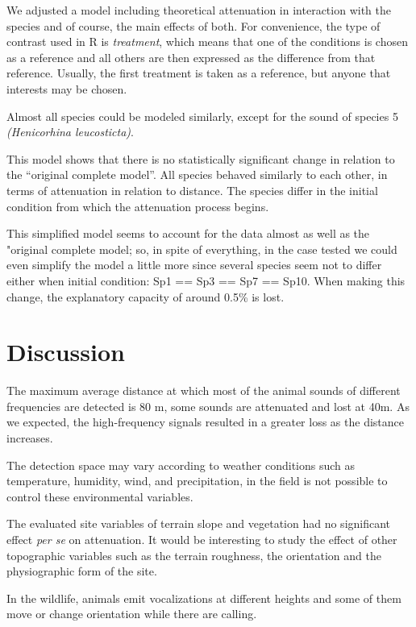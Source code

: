 \documentclass[fleqn,10pt,lineno]{wlpeerj} %
\begin{document}
We adjusted a model including theoretical attenuation in interaction with the species and of course, the main effects of both. For convenience, the type of contrast used in R is \emph{treatment}, which means that one of the conditions is chosen as a reference and all others are then expressed as the difference from that reference. Usually, the first treatment is taken as a reference, but anyone that interests may be chosen.

Almost all species could be modeled similarly, except for the sound of species 5 \emph{(Henicorhina leucosticta)}.

This model shows that there is no statistically significant change in relation to the ``original complete model''. All species behaved similarly to each other, in terms of attenuation in relation to distance. The species differ in the initial condition from which the attenuation process begins.

This simplified model seems to account for the data almost as well as the "original complete model; so, in spite of everything, in the case tested we could even simplify the model a little more since several species seem not to differ either when initial condition: Sp1 == Sp3 == Sp7 == Sp10. When making this change, the explanatory capacity of around 0.5\% is lost.

\hypertarget{discussion}{%
\section*{Discussion}\label{discussion}}

The maximum average distance at which most of the animal sounds of different frequencies are detected is 80 m, some sounds are attenuated and lost at 40m. As we expected, the high-frequency signals resulted in a greater loss as the distance increases.

The detection space may vary according to weather conditions such as temperature, humidity, wind, and precipitation, in the field is not possible to control these environmental variables.

The evaluated site variables of terrain slope and vegetation had no significant effect \emph{per se} on attenuation. It would be interesting to study the effect of other topographic variables such as the terrain roughness, the orientation and the physiographic form of the site.

In the wildlife, animals emit vocalizations at different heights and some of them move or change orientation while there are calling.
\end{document}
